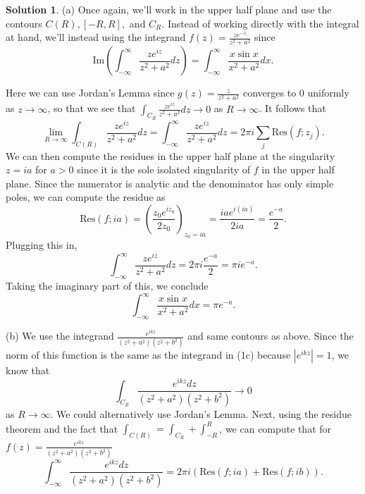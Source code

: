 \documentclass[12pt]{article}
\newcommand{\abs}[1]{ \left| #1 \right| }
\newcommand{\Res}{\text{Res}}
\renewcommand{\Im}{\text{Im}}
\theoremstyle{definition}
\newtheorem{sol}{Solution}
\theoremstyle{remark}
\begin{document}
\begin{sol}
\leavevmode
(a) Once again, we'll work in the upper half plane and use the contours $C(R), [-R, R],$ and $C_R$. Instead of working directly with the integral at hand, we'll instead using the integrand $f(z) = \frac{ze^{-z}}{z^2+a^2}$ since
\begin{equation}
    \Im\left(\int_{-\infty}^{\infty} \frac{z e^{iz}}{z^2+a^2}dz \right) =  \int_{-\infty}^{\infty} \frac{x\sin x}{x^2+a^2}dx.
\end{equation}

Here we can use Jordan's Lemma since $g(z) = \frac{z}{z^2 + a^2}$ converges to 0 uniformly as $z\to\infty$, so that we see that $\int_{C_R}  \frac{z e^{iz}}{z^2+a^2}dz \to 0$ as $R\to\infty$. It follows that 
\begin{equation}
    \lim\limits_{R\to\infty} \int_{C(R)} \frac{z e^{iz}}{z^2+a^2}dz =  \int_{-\infty}^{\infty} \frac{z e^{iz}}{z^2+a^2}dz =  2\pi i \sum_j \Res(f;z_j).
\end{equation} We can then compute the residues in the upper half plane at the singularity $z=ia$ for $a>0$ since it is the sole isolated singularity of $f$ in the upper half plane. Since the numerator is analytic and the denominator has only simple poles, we can compute the residue as 
\begin{equation}
    \Res(f; ia) = \left(\frac{z_0 e^{iz_0}}{2z_0}\right)_{z_0=ia} = \frac{iae^{i (ia)}}{2ia} = \frac{e^{-a}}{2}. 
\end{equation}
Plugging this in,
\begin{equation}
    \int_{-\infty}^{\infty} \frac{z e^{iz}}{z^2+a^2}dz =  2\pi i  \frac{e^{-a}}{2} = \pi i e^{-a}.
\end{equation}
Taking the imaginary part of this, we conclude 
\begin{equation}
     \int_{-\infty}^{\infty} \frac{x\sin x}{x^2+a^2}dx =  \pi e^{-a}.
\end{equation}

\newpage

(b) We use the integrand $\frac{e^{ikz}}{(z^2+a^2)(z^2+b^2)}$ and same contours as above. Since the norm of this function is the same as the integrand in (1c) because $\abs{e^{ikz}} = 1$, we know that 
\begin{equation}
    \int_{C_R} \frac{e^{ikz}dz}{(z^2+a^2)(z^2+b^2)} \to 0 
\end{equation}
as $R\to \infty$. We could alternatively use Jordan's Lemma. Next, using the residue theorem and the fact that $\int_{C(R)} = \int_{C_R} + \int_{-R}^{R}$, we can compute that for $f(z) = \frac{e^{ikz}}{(z^2+a^2)(z^2+b^2)}$
\begin{equation}
    \int_{-\infty}^{\infty} \frac{e^{ikz}dz}{(z^2+a^2)(z^2+b^2)} = 2\pi i \left( \Res \left(f; ia \right)  +  \Res \left( f ; ib \right) \right). 
\end{equation}


\end{sol}
\end{document}
